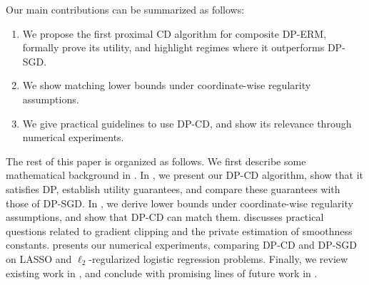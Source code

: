 Our main contributions can be summarized as follows:
\begin{enumerate}
  \item We propose the first proximal CD algorithm for composite DP-ERM,
        formally prove its utility, and highlight regimes where it outperforms DP-SGD.
  \item We show matching lower bounds under coordinate-wise regularity
        assumptions.
      \item We give practical guidelines to use DP-CD, and show its
        relevance through numerical experiments.
\end{enumerate}


The rest of this paper is organized as follows.
We first describe some mathematical background in
.
In , we present our DP-CD algorithm,
show that it satisfies DP, establish utility guarantees, and
compare these guarantees with those of DP-SGD.
In , we derive lower bounds under
coordinate-wise regularity assumptions, and
show that DP-CD can match them.  discusses practical
questions related to gradient clipping and the private estimation of
smoothness constants.
 presents our numerical experiments,
comparing DP-CD and DP-SGD on LASSO and $\ell_2$-regularized
logistic regression problems. %
Finally, we review existing work in
, and conclude with promising lines of future work in
.

